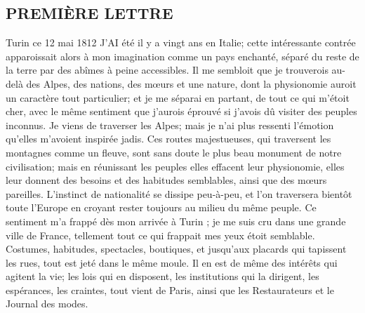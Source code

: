 \subsection{PREMIÈRE LETTRE}
Turin ce 12 mai 1812
J'AI été il y a vingt ans en Italie; cette intéressante contrée apparoissait alors à mon imagination comme un pays enchanté, séparé du reste de la terre par des abîmes à peine accessibles. Il me sembloit que je trouverois au-delà des Alpes, des nations, des mœurs et une nature, dont la physionomie auroit un caractère tout particulier; et je me séparai en partant, de tout ce qui m'étoit cher, avec le même sentiment que j'aurois éprouvé si j'avois dû visiter des peuples inconnus.
Je viens de traverser les Alpes; mais je n'ai plus ressenti l'émotion qu'elles m'avoient inspirée jadis. Ces routes majestueuses, qui traversent les montagnes comme un fleuve, sont sans doute le plus beau monument de notre civilisation; mais en réunissant les peuples elles effacent leur physionomie, elles leur donnent des besoins et des habitudes semblables, ainsi que des mœurs pareilles. L'instinct de nationalité se dissipe peu-à-peu, et\setcounter{page}{364} l'on traversera bientôt toute l'Europe en croyant rester toujours au milieu du même peuple.
Ce sentiment m'a frappé dès mon arrivée à Turin ; je me suis cru dans une grande ville de France, tellement tout ce qui frappait mes yeux étoit semblable. Costumes, habitudes, spectacles, boutiques, et jusqu'aux placards qui tapissent les rues, tout est jeté dans le même moule. Il en est de même des intérêts qui agitent la vie; les lois qui en disposent, les institutions qui la dirigent, les espérances, les craintes, tout vient de Paris, ainsi que les Restaurateurs et le Journal des modes.
